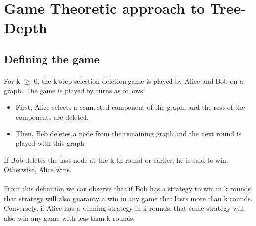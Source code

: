 \section{Game Theoretic approach to Tree-Depth}

\subsection{Defining the game}
\paragraph{}
For k $\geq$ 0, the k-step selection-deletion game is played by Alice and Bob on a graph. The game is played by turns as follows:
\begin{itemize}
  \item First, Alice selects a connected component of the graph, and the rest of the components are deleted.
  \item Then, Bob deletes a node from the remaining graph and the next round is played with this graph.
\end{itemize}

If Bob deletes the last node at the k-th round or earlier, he is said to win. Otherwise, Alice wins.
\paragraph{}
From this definition we can observe that if Bob has a strategy to win in k rounds that strategy will also guaranty a win in any game that lasts more than k rounds. Conversely, if Alice has a winning strategy in k-rounds, that same strategy will also win any game with less than k rounds.

